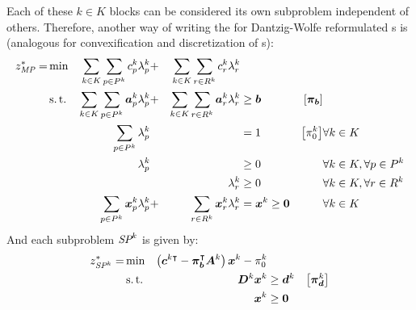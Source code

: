 Each of these $k \in K$ blocks can be considered its own subproblem independent of others. Therefore, another way of writing the \MP{} for Dantzig-Wolfe reformulated \LP{}s is (analogous for convexification and discretization of \IP{}s):
\begin{equation}
\begin{aligned}
z^*_{\textit{MP}}{} = &\min & \sum_{k \in K}\sum_{p \in P^k} c_p^k \lambda_p^k & + & \sum_{k \in K}\sum_{r \in R^k} c_r^k \lambda_r^k & & & \\
&\operatorname{s.t.} & \sum_{k \in K}\sum_{p \in P^k} {\bm{a}}_p^k \lambda_p^k & + & \sum_{k \in K}\sum_{r \in R^k} {\bm{a}}_r^k \lambda_r^k & \geq {\bm{b}} & \left[{\bm{\pi}}_{\bm{b}}\right] & \\
&& \sum_{p \in P^k} \lambda_p^k & & & = 1 & \left[\pi_0^k \right] & \forall k \in K \\
&& \lambda_p^k & & & \geq 0 & & \forall k \in K, \forall p \in P^k \\
&& & & \lambda_r^k & \geq 0 & & \forall k \in K, \forall r \in R^k \\
&& \sum_{p \in P^k} {\bm{x}}_p^k \lambda_p^k & + & \sum_{r \in R^k} {\bm{x}}_r^k \lambda_r^k & = {\bm{x}}^k \geq {\bm{0}} & & \forall k \in K
\end{aligned}
\end{equation}
And each subproblem $\SP{k}$ is given by:
\begin{equation}
\begin{aligned}
z^*_\SP{k} = &\min & \left( \vec{c}^{k \intercal} - \vec{\pi}_\vec{b}\transpose \mat{A}^k \right) \vec{x}^k - \pi_0^k & & \\
&\st & \mat{D}^k \vec{x}^k & \geq \vec{d}^k & \left[\vec{\pi}_\vec{d}^k\right] \\
&& \vec{x}^k & \geq \vec{0}
\end{aligned}
\end{equation}

